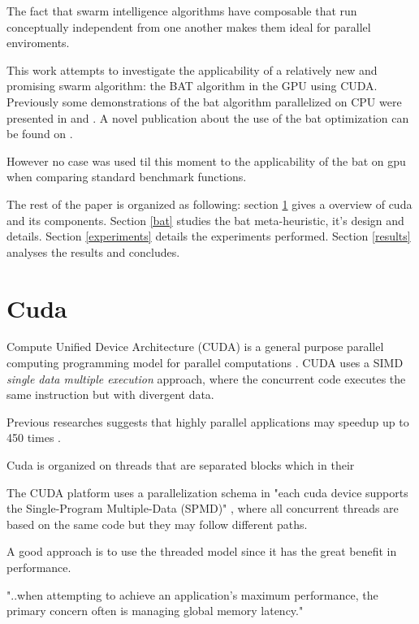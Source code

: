 \documentclass[conference]{IEEEtran}
\begin{document}
The fact that swarm intelligence algorithms have composable that run
conceptually independent from one another makes them ideal for parallel
enviroments.

This work attempts to investigate the applicability of a relatively new
and promising swarm algorithm: the BAT algorithm in the GPU using CUDA.
Previously some demonstrations of the bat algorithm parallelized on CPU
were presented in \cite{paralellCPUFirst} and \cite{paralellCPU}. A
novel publication about the use of the bat optimization can be found on
\cite{firstBatGPU}.

However no case was used til this moment to the applicability of the bat on gpu when comparing standard benchmark functions.

The rest of the paper is organized as following: section \ref{cuda}
gives a overview of cuda and its components. Section \ref{bat}
studies the bat meta-heuristic, it's design and details. Section
\ref{experiments} details the experiments performed. Section
\ref{results} analyses the results and concludes.


\section{Cuda} \label{cuda}%

Compute Unified Device Architecture (CUDA) is a general purpose
parallel computing programming model for parallel computations \cite{cudaDefinition}. CUDA    
uses a SIMD \textit{single data multiple execution} approach, where the 
concurrent code executes the same instruction but with divergent data.  

Previous researches suggests that highly parallel
applications may speedup up to 450 times \cite{cuda_optimizations}.


Cuda is organized on threads that are separated blocks which in their

The CUDA platform uses a parallelization schema in "each cuda
device supports the Single-Program Multiple-Data (SPMD)"
\cite{cuda_optimizations}, where all concurrent threads are based on the
same code but they may follow different paths.

A good approach is to use the threaded model since it has the great benefit in performance.

"..when attempting to achieve an application's maximum
performance, the primary concern often is managing global memory
latency." \cite{cuda_optimizations}
\end{document}
